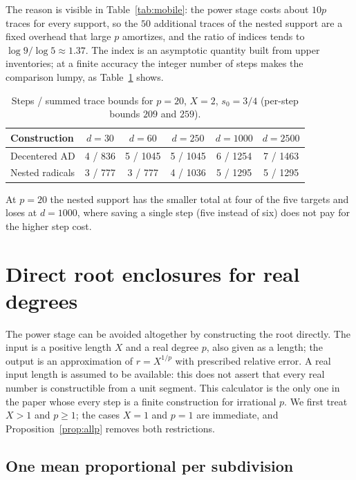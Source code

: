 The reason is visible in Table~\ref{tab:mobile}: the power stage costs about $10p$ traces for every
support, so the $50$ additional traces of the nested support are a fixed overhead that large $p$
amortizes, and the ratio of indices tends to $\log9/\log5\approx1.37$. The index is an asymptotic
quantity built from upper inventories; at a finite accuracy the integer number of steps makes the
comparison lumpy, as Table~\ref{tab:p20} shows.

\begin{table}[h]
\centering\small
\caption{Steps / summed trace bounds for $p=20$, $X=2$, $s_0=3/4$ (per-step bounds $209$ and
$259$).}\label{tab:p20}
\begin{tabular}{@{}lccccc@{}}
\toprule
Construction & $d=30$ & $d=60$ & $d=250$ & $d=1000$ & $d=2500$\\
\midrule
Decentered AD & 4 / 836 & 5 / 1045 & 5 / 1045 & 6 / 1254 & 7 / 1463\\
Nested radicals & 3 / 777 & 3 / 777 & 4 / 1036 & 5 / 1295 & 5 / 1295\\
\bottomrule
\end{tabular}
\end{table}

At $p=20$ the nested support has the smaller total at four of the five targets and loses at
$d=1000$, where saving a single step (five instead of six) does not pay for the higher step cost.

\section{Direct root enclosures for real degrees}\label{sec:enclosure}

The power stage can be avoided altogether by constructing the root directly. The input is a positive
length $X$ and a real degree $p$, also given as a length; the output is an approximation of
$r=X^{1/p}$ with prescribed relative error. A real input length is assumed to be available: this does
not assert that every real number is constructible from a unit segment. This calculator is the only one in the paper whose every
step is a finite construction for irrational $p$. We first treat $X>1$ and $p\ge1$; the cases $X=1$ and
$p=1$ are immediate, and Proposition~\ref{prop:allp} removes both restrictions.

\subsection{One mean proportional per subdivision}

